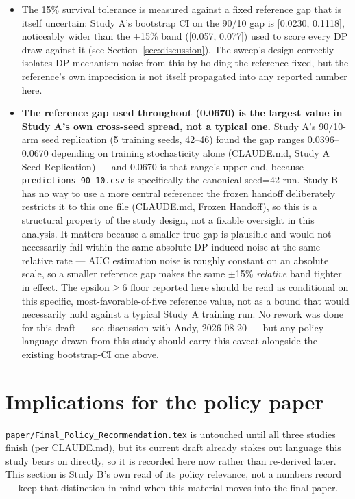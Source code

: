 \documentclass[11pt]{article}
\begin{document}
\begin{itemize}
\item The 15\% survival tolerance is measured against a fixed reference gap that is itself uncertain: Study A's bootstrap CI on the 90/10 gap is [0.0230, 0.1118], noticeably wider than the $\pm$15\% band ([0.057, 0.077]) used to score every DP draw against it (see Section~\ref{sec:discussion}). The sweep's design correctly isolates DP-mechanism noise from this by holding the reference fixed, but the reference's own imprecision is not itself propagated into any reported number here.
\item \textbf{The reference gap used throughout (0.0670) is the largest value in Study A's own cross-seed spread, not a typical one.} Study A's 90/10-arm seed replication (5 training seeds, 42--46) found the gap ranges 0.0396--0.0670 depending on training stochasticity alone (CLAUDE.md, Study A Seed Replication) --- and 0.0670 is that range's upper end, because \texttt{predictions\_90\_10.csv} is specifically the canonical seed=42 run. Study B has no way to use a more central reference: the frozen handoff deliberately restricts it to this one file (CLAUDE.md, Frozen Handoff), so this is a structural property of the study design, not a fixable oversight in this analysis. It matters because a smaller true gap is plausible and would not necessarily fail within the same absolute DP-induced noise at the same relative rate --- AUC estimation noise is roughly constant on an absolute scale, so a smaller reference gap makes the same $\pm$15\% \emph{relative} band tighter in effect. The epsilon$\geq$6 floor reported here should be read as conditional on this specific, most-favorable-of-five reference value, not as a bound that would necessarily hold against a typical Study A training run. No rework was done for this draft --- see discussion with Andy, 2026-08-20 --- but any policy language drawn from this study should carry this caveat alongside the existing bootstrap-CI one above.
\end{itemize}

\section{Implications for the policy paper}
\label{sec:policy-implications}

\texttt{paper/Final\_Policy\_Recommendation.tex} is untouched until all three studies finish (per CLAUDE.md), but its current draft already stakes out language this study bears on directly, so it is recorded here now rather than re-derived later. This section is Study B's own read of its policy relevance, not a numbers record --- keep that distinction in mind when this material moves into the final paper.
\end{document}
